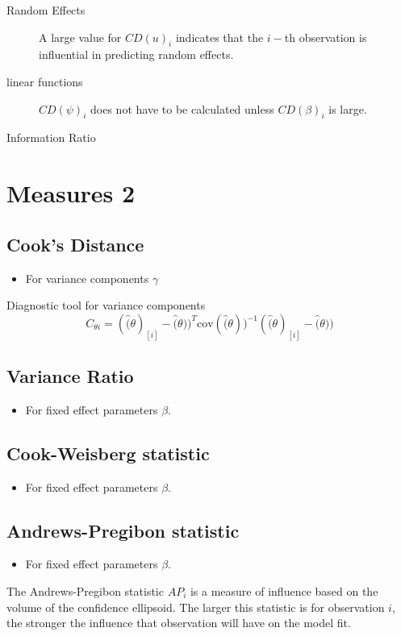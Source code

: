 \begin{description}
\item[Random Effects]

A large value for $CD(u)_i$ indicates that the $i-$th observation is influential in predicting random effects.

\item[linear functions]
$CD(\psi)_i$ does not have to be calculated unless $CD(\beta)_i$ is large.


\item[Information Ratio]
\end{description}

\newpage
\section{Measures 2} %

\subsection{Cook's Distance} %
\begin{itemize}
\item For variance components $\gamma$
\end{itemize}

Diagnostic tool for variance components
\[ C_{\theta i} =(\hat(\theta)_{[i]} - \hat(\theta))^{T}\mbox{cov}( \hat(\theta))^{-1}(\hat(\theta)_{[i]} - \hat(\theta))\]

\subsection{Variance Ratio} %
\begin{itemize}
\item For fixed effect parameters $\beta$.
\end{itemize}

\subsection{Cook-Weisberg statistic} %
\begin{itemize}
\item For fixed effect parameters $\beta$.
\end{itemize}

\subsection{Andrews-Pregibon statistic} %
\begin{itemize}
\item For fixed effect parameters $\beta$.
\end{itemize}
The Andrews-Pregibon statistic $AP_{i}$ is a measure of influence based on the volume of the confidence ellipsoid.
The larger this statistic is for observation $i$, the stronger the influence that observation will have on the model fit.


